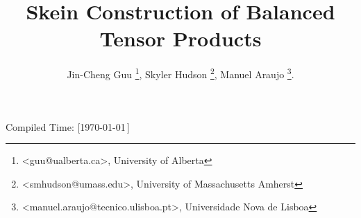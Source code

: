 \title{\vspace{-30pt} Skein Construction of Balanced Tensor Products}
\author{
  Jin-Cheng Guu \thanks{<guu@ualberta.ca>, University of Alberta},
  Skyler Hudson \thanks{<smhudson@umass.edu>, University of Massachusetts Amherst},
  Manuel Araujo \thanks{<manuel.araujo@tecnico.ulisboa.pt>, Universidade Nova de Lisboa}.
}
\date{}

\newcommand{\III}[9]{%
  {}^{#1}_{#2} I^{#3}_{#4}
  \left(
    \begin{matrix}
      #5 \\ {}\\ #6
    \end{matrix}
    \,\middle|\,
    \begin{matrix}
      #7 \\ #8 \\ #9
    \end{matrix}
  \right)
}
\newcommand{\II}[7]{%
  {}^{#1}_{#2} I^{#3}_{#4}
  \left( #5, #6
    \,\middle|\,
    #7
  \right)
}



\maketitle

\vspace{-30pt}


\begin{flushright}
  \tiny{Compiled Time: [\today\,\DTMcurrenttime]}
\end{flushright}

\vspace{-25pt}
\tableofcontents

